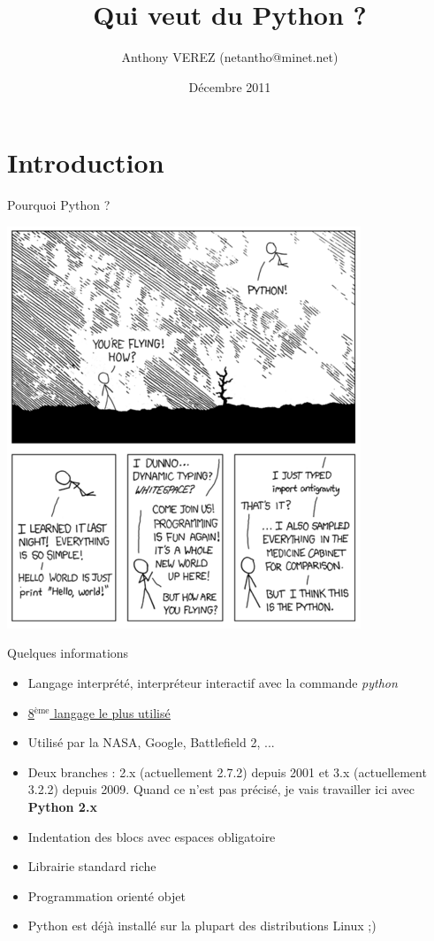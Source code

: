 \documentclass{beamer}
\title{Qui veut du Python ?}
\author{Anthony VEREZ (netantho@minet.net)}
\date{Décembre 2011}
\begin{document}
\begin{frame}
\titlepage
\end{frame}

\section{Introduction}

\begin{frame}{Pourquoi Python ?}
 \begin{center}
 \includegraphics[scale=0.3]{./Python_cartoon.png}
\end{center}

\end{frame}

\begin{frame}{Quelques informations}
\begin{itemize}
 \item Langage interprété, interpréteur interactif avec la commande \textit{python}
 \item \underline{\href{http://www.tiobe.com/index.php/content/paperinfo/tpci/index.html}{8$^{\text{ème}}$ langage le plus utilisé}}
 \item Utilisé par la NASA, Google, Battlefield 2, ...
 \item Deux branches : 2.x (actuellement 2.7.2) depuis 2001 et 3.x (actuellement 3.2.2) depuis 2009. Quand ce n'est pas précisé, je vais travailler ici avec \textbf{Python 2.x}
 \item Indentation des blocs avec espaces obligatoire
 \item Librairie standard riche
 \item Programmation orienté objet
 \item Python est déjà installé sur la plupart des distributions Linux ;)
\end{itemize}
\end{frame}
\end{document}
